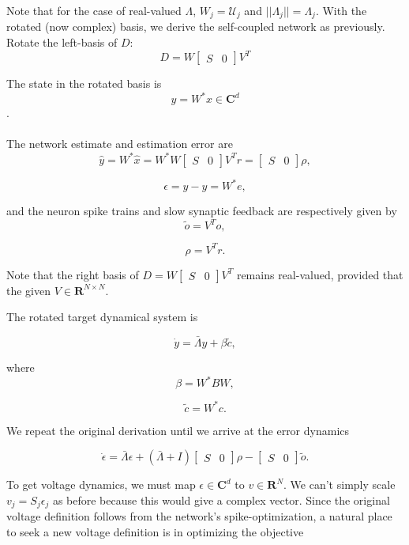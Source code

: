 Note that for the case of real-valued $\Lambda$, $W_j = \mathcal{U}_j$ and $||\Lambda_j|| = \Lambda_j$. With the rotated (now complex) basis, we derive the self-coupled network as previously. Rotate the left-basis of $D$:
$$
D = W \begin{bmatrix}
S & 0
\end{bmatrix}
V^T
$$


The state in the rotated basis is 
$$ y = W^* x \in \mathbf{C}^d$$.
\\
\\
The network estimate and estimation error are 
$$
\hat{y} = W^* \hat{x} = W^* W \begin{bmatrix} S & 0 \end{bmatrix} V^T r = \begin{bmatrix} S & 0 \end{bmatrix} \rho,
$$

$$
\epsilon = y-\hat{y} = W^* e,
$$

and the neuron spike trains and slow synaptic feedback are respectively given by
$$
\tilde{o} = V^T o,
$$

$$
\rho = V^T r.
$$

Note that the right basis of $D = W \begin{bmatrix}S & 0 \end{bmatrix} V^T$ remains real-valued, provided that the given  $V \in \mathbf{R}^{N \times N}$.

The rotated target dynamical system is

$$
\dot{y} = \bar{\Lambda} y + \beta \tilde{c},
$$

where 
$$
\beta = W^* B W,
$$

$$
\tilde{c} = W^* c.
$$

We repeat the original derivation until we arrive at the error dynamics 

$$
\dot{\epsilon}
= 
\bar{\Lambda} \epsilon
+
\left( 
\bar{\Lambda} + I
\right)
\begin{bmatrix}
S & 0
\end{bmatrix}
\rho
-
\begin{bmatrix}
S & 0
\end{bmatrix}
\tilde{o}.
$$

To get voltage dynamics, we must map $\epsilon \in \mathbf{C}^d$ to $v \in \mathbf{R}^{N}$. We can't simply scale $v_j = S_j \epsilon_j$ as before because this would give a complex vector. Since the original voltage definition follows from the network's spike-optimization, a natural place to seek a new voltage definition is in optimizing the objective

